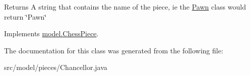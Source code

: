 \begin{DoxyReturn}{Returns}
A string that contains the name of the piece, ie the \hyperlink{classmodel_1_1pieces_1_1_pawn}{Pawn} class would return \char`\"{}\-Pawn\char`\"{} 
\end{DoxyReturn}


Implements \hyperlink{classmodel_1_1_chess_piece_a68308e2fa0fe868f7386d40c6cd925df}{model.\-Chess\-Piece}.



The documentation for this class was generated from the following file\-:\begin{DoxyCompactItemize}
\item 
src/model/pieces/Chancellor.\-java\end{DoxyCompactItemize}
